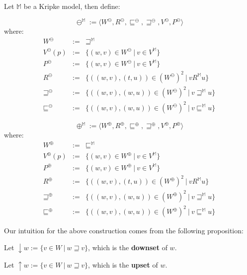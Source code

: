 \begin{mydef}
\label{Plus-Minus-Bisimulators}
Let $\mathbb{M}$ be a Kripke model, then define:

\begin{minipage}[b]{0.5\linewidth}
$$\ominus^\mathbb{M} := \langle W^{\ominus}, R^{\ominus}, \sqsubseteq^{\ominus},
\sqsupseteq^{\ominus}, V^{\ominus}, P^{\ominus} \rangle$$ 
where:
 \begin{eqnarray*}
 W^\ominus & := &  \sqsupseteq^{\mathbb{M}} \\
 V^\ominus(p) & := &  \{(w,v) \in   W^\ominus \ |\ v \in V^{\mathbb{M}} \}\\
 P^\ominus & := & \{(w,v) \in   W^\ominus \ |\ v \in V^{\mathbb{M}} \} \\
 R^\ominus & := &  \{((w,v), (t,u)) \in   (W^\ominus)^2 \ |\ v R^\mathbb{M} u \}  \\
 \sqsupseteq^\ominus & := &  \{((w,v), (w,u)) \in   (W^\ominus)^2 \ |\ v \sqsupseteq^{\mathbb{M}} u \}  \\
 \sqsubseteq^\ominus & := &  \{((w,v), (w,u)) \in   (W^\ominus)^2 \ |\ v \sqsubseteq^{\mathbb{M}} u \}  
 \end{eqnarray*}
\end{minipage}
\hspace{0.5cm}
\begin{minipage}[b]{0.5\linewidth}
$$\oplus^\mathbb{M} := \langle W^{\oplus}, R^{\oplus}, \sqsubseteq^{\oplus},
\sqsupseteq^{\oplus}, V^{\oplus}, P^{\oplus} \rangle$$ 
where:
 \begin{eqnarray*}
 W^\oplus & := &  \sqsubseteq^{\mathbb{M}} \\
 V^\oplus(p) & := &  \{(w,v) \in   W^\oplus \ |\ v \in V^{\mathbb{M}} \}\\
 P^\oplus & := & \{(w,v) \in   W^\oplus \ |\ v \in V^{\mathbb{M}} \} \\
 R^\oplus & := &  \{((w,v), (t,u)) \in   (W^\oplus)^2 \ |\ v R^\mathbb{M} u \}  \\
 \sqsupseteq^\oplus & := &  \{((w,v), (w,u)) \in   (W^\oplus)^2 \ |\ v \sqsupseteq^{\mathbb{M}} u \}  \\
 \sqsubseteq^\oplus & := &  \{((w,v), (w,u)) \in   (W^\oplus)^2 \ |\ v \sqsubseteq^{\mathbb{M}} u \}  
 \end{eqnarray*}
\end{minipage}
\end{mydef}

Our intuition for the above construction comes from the following proposition:
\begin{mydef}
Let $\downarrow w := \{ v \in W \ |\ w \sqsupseteq v\}$, which is the
\textbf{downset} of $w$.

Let $\uparrow w := \{ v \in W \ |\ w \sqsupseteq v\}$, which is the
\textbf{upset} of $w$.
\end{mydef}

